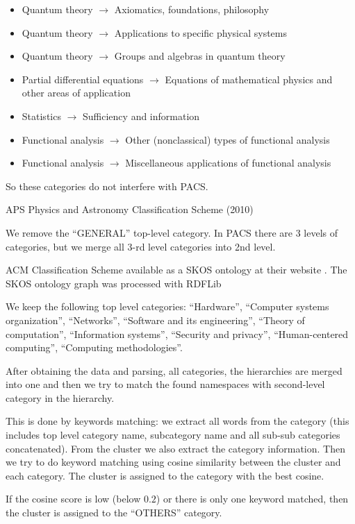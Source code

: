 \begin{itemize}
\item Quantum theory $\to$ Axiomatics, foundations, philosophy
\item Quantum theory $\to$ Applications to specific physical systems
\item Quantum theory $\to$ Groups and algebras in quantum theory
\item Partial differential equations $\to$ Equations of mathematical physics and other areas of application
\item Statistics $\to$ Sufficiency and information
\item Functional analysis $\to$ Other (nonclassical) types of functional analysis
\item Functional analysis $\to$ Miscellaneous applications of functional analysis
\end{itemize}

So these categories do not interfere with PACS. 


APS Physics and Astronomy Classification Scheme (2010) \cite{aps2010pacs}

We remove the ``GENERAL'' top-level category. 
In PACS there are 3 levels of categories, but we merge all 3-rd level categories into 
2nd level.

ACM Classification Scheme \cite{rous2012acm} available as a SKOS \cite{miles2005skos} ontology 
at their website \cite{amc2012ccs}. The SKOS ontology graph was processed with RDFLib \cite{rdflib}

We keep the following top level categories:
``Hardware'', ``Computer systems organization'', ``Networks'', 
``Software and its engineering'', ``Theory of computation'', 
``Information systems'', ``Security and privacy'',
``Human-centered computing'', ``Computing methodologies''.

After obtaining the data and parsing, all categories, the hierarchies 
are merged into one and then we try to match the found namespaces 
with second-level category in the hierarchy. 

This is done by keywords matching: we extract all words from the 
category (this includes top level category name, subcategory name
and all sub-sub categories concatenated). From the cluster 
we also extract the category information.
Then we try to do keyword matching using cosine similarity 
between the cluster and each category. The cluster is assigned 
to the category with the best cosine. 

If the cosine score is low (below $0.2$) or there is only one 
keyword matched, then the cluster is assigned to the ``OTHERS'' 
category.


